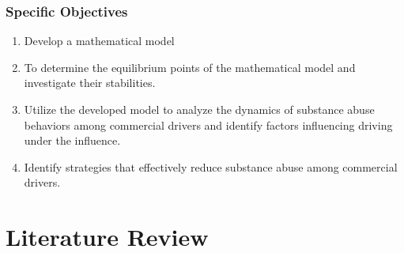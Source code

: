 \documentclass[12pt]{report}
\begin{document}
\subsection{Specific Objectives}
\begin{enumerate}
		\item Develop a mathematical model
		\item To determine the equilibrium points of the mathematical model and investigate
		their stabilities.
		\item Utilize the developed model to analyze the dynamics of substance abuse behaviors among commercial drivers and identify  factors influencing  driving under the influence.
		\item Identify strategies that effectively reduce substance abuse among commercial drivers.
	\end{enumerate}
	
		\chapter{Literature Review}
		
\end{document}
